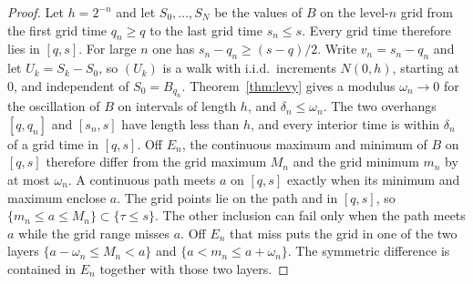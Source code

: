 \begin{proof}
Let $h=2^{-n}$ and let $S_0,\ldots,S_N$ be the values of $B$ on the level-$n$ grid from the first grid time $q_n\ge q$ to the last grid time $s_n\le s$. Every grid time therefore lies in $[q,s]$. For large $n$ one has $s_n-q_n\ge(s-q)/2$. Write $v_n=s_n-q_n$ and let $U_k=S_k-S_0$, so $(U_k)$ is a walk with i.i.d.\ increments $N(0,h)$, starting at $0$, and independent of $S_0=B_{q_n}$. Theorem~\ref{thm:levy} gives a modulus $\omega_n\to0$ for the oscillation of $B$ on intervals of length $h$, and $\delta_n\le\omega_n$. The two overhangs $[q,q_n]$ and $[s_n,s]$ have length less than $h$, and every interior time is within $\delta_n$ of a grid time in $[q,s]$. Off $E_n$, the continuous maximum and minimum of $B$ on $[q,s]$ therefore differ from the grid maximum $M_n$ and the grid minimum $m_n$ by at most $\omega_n$. A continuous path meets $a$ on $[q,s]$ exactly when its minimum and maximum enclose $a$. The grid points lie on the path and in $[q,s]$, so $\{m_n\le a\le M_n\}\subset\{\tau\le s\}$. The other inclusion can fail only when the path meets $a$ while the grid range misses $a$. Off $E_n$ that miss puts the grid in one of the two layers $\{a-\omega_n\le M_n<a\}$ and $\{a<m_n\le a+\omega_n\}$. The symmetric difference is contained in $E_n$ together with those two layers.


\end{proof}
